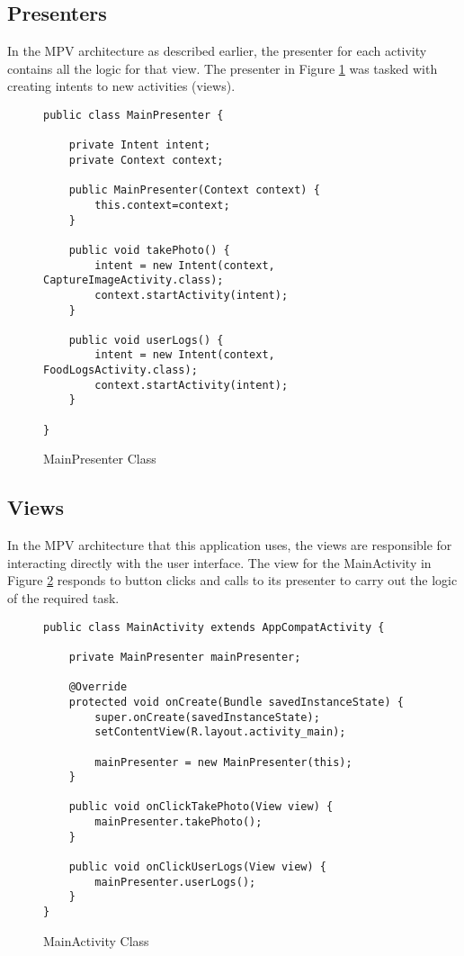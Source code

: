 \tocless\subsection{Presenters}
In the MPV architecture as described earlier, the presenter for each activity contains all the logic for that view.
The presenter in Figure \ref{lst:pres} was tasked with creating intents to new activities (views).
\begin{figure}[h]
\caption{MainPresenter Class}
\label{lst:pres}
\begin{lstlisting}[style=Java]
public class MainPresenter {

    private Intent intent;
    private Context context;

    public MainPresenter(Context context) {
        this.context=context;
    }

    public void takePhoto() {
        intent = new Intent(context, CaptureImageActivity.class);
        context.startActivity(intent);
    }

    public void userLogs() {
        intent = new Intent(context, FoodLogsActivity.class);
        context.startActivity(intent);
    }

}
\end{lstlisting}
\end{figure}

\tocless\subsection{Views}
In the MPV architecture that this application uses, the views are responsible for interacting directly with the user interface.
The view for the MainActivity in Figure \ref{lst:mainView} responds to button clicks and calls to its presenter to carry out the logic of the required task.
\begin{figure}[h]
\caption{MainActivity Class}
\label{lst:mainView}
\begin{lstlisting}[style=Java]
public class MainActivity extends AppCompatActivity {

    private MainPresenter mainPresenter;

    @Override
    protected void onCreate(Bundle savedInstanceState) {
        super.onCreate(savedInstanceState);
        setContentView(R.layout.activity_main);

        mainPresenter = new MainPresenter(this);
    }

    public void onClickTakePhoto(View view) {
        mainPresenter.takePhoto();
    }

    public void onClickUserLogs(View view) {
        mainPresenter.userLogs();
    }
}
\end{lstlisting}
\end{figure}

